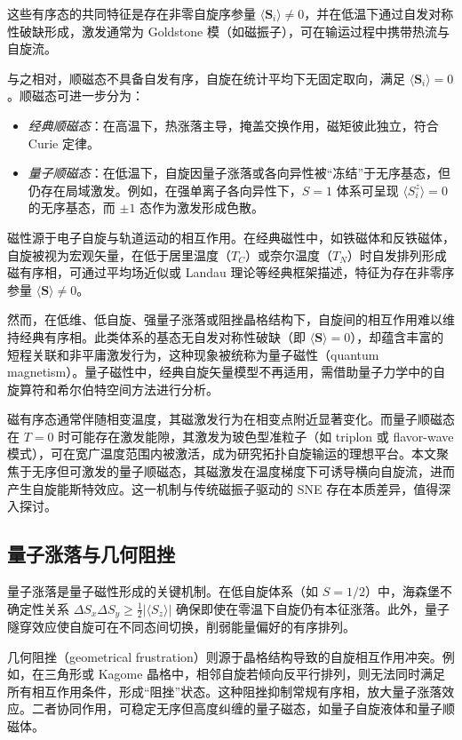 这些有序态的共同特征是存在非零自旋序参量 $\langle \mathbf{S}_i \rangle \neq 0$，并在低温下通过自发对称性破缺形成，激发通常为 Goldstone 模（如磁振子），可在输运过程中携带热流与自旋流。

与之相对，顺磁态不具备自发有序，自旋在统计平均下无固定取向，满足 $\langle \mathbf{S}_i \rangle = 0$。顺磁态可进一步分为：

\begin{itemize}
    \item \emph{经典顺磁态}：在高温下，热涨落主导，掩盖交换作用，磁矩彼此独立，符合 Curie 定律。
    \item \emph{量子顺磁态}：在低温下，自旋因量子涨落或各向异性被“冻结”于无序基态，但仍存在局域激发。例如，在强单离子各向异性下，$S=1$ 体系可呈现 $\langle S^z_i \rangle = 0$ 的无序基态，而 $\pm 1$ 态作为激发形成色散。
\end{itemize}

磁性源于电子自旋与轨道运动的相互作用。在经典磁性中，如铁磁体和反铁磁体，自旋被视为宏观矢量，在低于居里温度（$T_C$）或奈尔温度（$T_N$）时自发排列形成磁有序相，可通过平均场近似或 Landau 理论等经典框架描述，特征为存在非零序参量 $\langle \mathbf{S} \rangle \neq 0$。

然而，在低维、低自旋、强量子涨落或阻挫晶格结构下，自旋间的相互作用难以维持经典有序相。此类体系的基态无自发对称性破缺（即 $\langle \mathbf{S} \rangle = 0$），却蕴含丰富的短程关联和非平庸激发行为，这种现象被统称为量子磁性（quantum magnetism）\cite{knolle2019Field,rau2016SpinOrbit}。量子磁性中，经典自旋矢量模型不再适用，需借助量子力学中的自旋算符和希尔伯特空间方法进行分析。

磁有序态通常伴随相变温度，其磁激发行为在相变点附近显著变化。而量子顺磁态在 $T=0$ 时可能存在激发能隙，其激发为玻色型准粒子（如 triplon 或 flavor-wave 模式），可在宽广温度范围内被激活，成为研究拓扑自旋输运的理想平台。本文聚焦于无序但可激发的量子顺磁态，其磁激发在温度梯度下可诱导横向自旋流，进而产生自旋能斯特效应。这一机制与传统磁振子驱动的 SNE 存在本质差异，值得深入探讨。

\subsection{量子涨落与几何阻挫}

量子涨落是量子磁性形成的关键机制。在低自旋体系（如 $S=1/2$）中，海森堡不确定性关系 $\Delta S_x \Delta S_y \geq \frac{1}{2} |\langle S_z \rangle|$ 确保即使在零温下自旋仍有本征涨落。此外，量子隧穿效应使自旋可在不同态间切换，削弱能量偏好的有序排列。

几何阻挫（geometrical frustration）则源于晶格结构导致的自旋相互作用冲突。例如，在三角形或 Kagome 晶格中，相邻自旋若倾向反平行排列，则无法同时满足所有相互作用条件，形成“阻挫”状态。这种阻挫抑制常规有序相，放大量子涨落效应。二者协同作用，可稳定无序但高度纠缠的量子磁态，如量子自旋液体和量子顺磁体。

